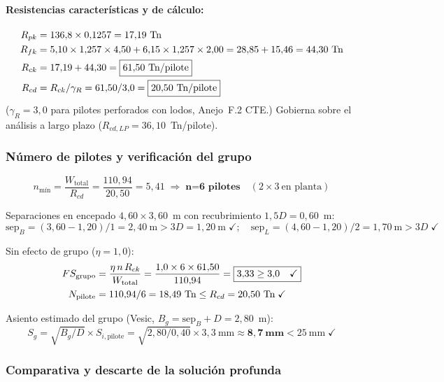 \paragraph{Resistencias características y de cálculo:}
\begin{align*}
  R_{pk}  &= 136{,}8\times0{,}1257 = 17{,}19~\text{Tn}\\
  R_{fk}  &= 5{,}10\times1{,}257\times4{,}50 + 6{,}15\times1{,}257\times2{,}00
           = 28{,}85+15{,}46 = 44{,}30~\text{Tn}\\
  R_{ck}  &= 17{,}19+44{,}30 = \boxed{61{,}50~\text{Tn/pilote}}\\
  R_{cd}  &= R_{ck}/\gamma_R = 61{,}50/3{,}0 = \boxed{20{,}50~\text{Tn/pilote}}
\end{align*}
($\gamma_R=3{,}0$ para pilotes perforados con lodos, Anejo~F.2 CTE.)
Gobierna sobre el análisis a largo plazo ($R_{cd,LP}=36{,}10$~Tn/pilote).

\subsubsection{Número de pilotes y verificación del grupo}

\[
  n_\text{mín} = \frac{W_\text{total}}{R_{cd}}
    = \frac{110{,}94}{20{,}50} = 5{,}41
    \;\Rightarrow\; \textbf{n=6~pilotes} \quad(2\times3~\text{en planta})
\]

Separaciones en encepado $4{,}60\times3{,}60$~m con recubrimiento $1{,}5D=0{,}60$~m:
\[
  \text{sep}_B = (3{,}60-1{,}20)/1 = 2{,}40~\text{m} > 3D=1{,}20~\text{m}\;\checkmark;\quad
  \text{sep}_L = (4{,}60-1{,}20)/2 = 1{,}70~\text{m} > 3D\;\checkmark
\]

Sin efecto de grupo ($\eta=1{,}0$):
\begin{align*}
  FS_\text{grupo}    &= \frac{\eta\,n\,R_{ck}}{W_\text{total}}
    = \frac{1{,}0\times6\times61{,}50}{110{,}94}
    = \boxed{3{,}33 \geq 3{,}0 \quad \checkmark}\\
  N_\text{pilote} &= 110{,}94/6 = 18{,}49~\text{Tn}
    \leq R_{cd}=20{,}50~\text{Tn}\;\checkmark
\end{align*}

Asiento estimado del grupo (Vesic, $B_g=\text{sep}_B+D=2{,}80$~m):
\[
  S_g = \sqrt{B_g/D}\times S_{i,\text{pilote}}
      = \sqrt{2{,}80/0{,}40}\times3{,}3~\text{mm}
      \approx \mathbf{8{,}7~\text{mm}} < 25~\text{mm}\;\checkmark
\]

\subsubsection{Comparativa y descarte de la solución profunda}

